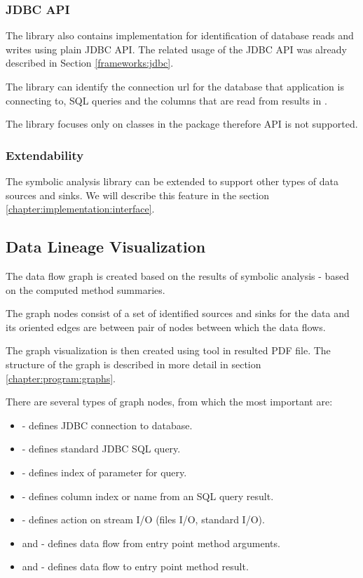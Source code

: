 \subsubsection{JDBC API}

The library also contains implementation for identification of
database reads and writes using plain JDBC API.
The related usage of the JDBC API was already described in Section \ref{frameworks:jdbc}.

The library can identify the connection url for the database
that application is connecting to, SQL queries and the columns
that are read from results in .

The library focuses only on classes in the package 
therefore  API is not supported.



\subsubsection{Extendability}

The symbolic analysis library can be extended to support other types
of data sources and sinks. We will describe this feature in the section \ref{chapter:implementation:interface}.



\subsection{Data Lineage Visualization \label{chapter:analysis:visualization}}

The data flow graph is created based on the results of symbolic analysis - based on
the computed method summaries.

The graph nodes consist of a set of identified sources and sinks for the data
and its oriented edges are between pair of nodes between which the data flows.

The graph visualization is then created using \citet{Graphviz} tool in resulted PDF file.
The structure of the graph is described in more detail in section \ref{chapter:program:graphs}.

There are several types of graph nodes, from which the most important are:
\begin{itemize}
  \item {} - defines JDBC connection to database.
  \item {} - defines standard JDBC SQL query.
  \item {} - defines index of parameter for query.
  \item {} - defines column index or name from an SQL query result.
  \item {} - defines action on stream I/O (files I/O, standard I/O).
  \item {} and  - defines data flow from entry point method arguments.
  \item {} and  - defines data flow to entry point method result.
\end{itemize}

